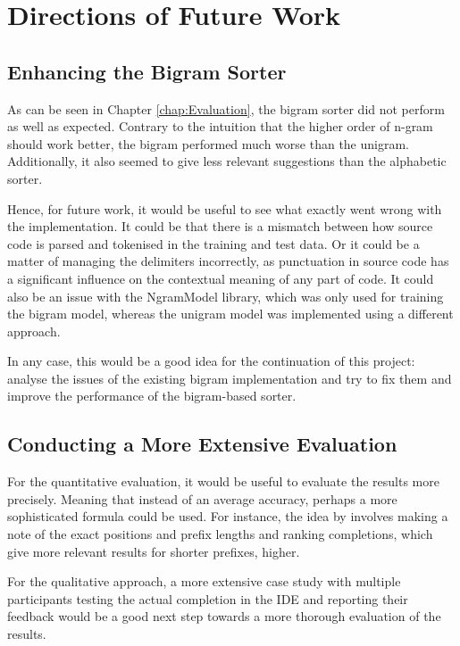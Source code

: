 \section{Directions of Future Work}
\label{sec:Conclusion-FutureWork}
\subsection{Enhancing the Bigram Sorter}
As can be seen in Chapter \ref{chap:Evaluation}, the bigram sorter did not perform as well as expected. Contrary to the intuition that the higher order of n-gram should work better, the bigram performed much worse than the unigram. Additionally, it also seemed to give less relevant suggestions than the alphabetic sorter.

Hence, for future work, it would be useful to see what exactly went wrong with the implementation. It could be that there is a mismatch between how source code is parsed and tokenised in the training and test data. Or it could be a matter of managing the delimiters incorrectly, as punctuation in source code has a significant influence on the contextual meaning of any part of code. It could also be an issue with the NgramModel library, which was only used for training the bigram model, whereas the unigram model was implemented using a different approach.

In any case, this would be a good idea for the continuation of this project: analyse the issues of the existing bigram implementation and try to fix them and improve the performance of the bigram-based sorter. 
\subsection{Conducting a More Extensive Evaluation}
For the quantitative evaluation, it would be useful to evaluate the results more precisely. Meaning that instead of an average accuracy, perhaps a more sophisticated formula could be used. For instance, the idea by \cite{Robb08a} involves making a note of the exact positions and prefix lengths and ranking completions, which give more relevant results for shorter prefixes, higher.

For the qualitative approach, a more extensive case study with multiple participants testing the actual completion in the IDE and reporting their feedback would be a good next step towards a more thorough evaluation of the results.